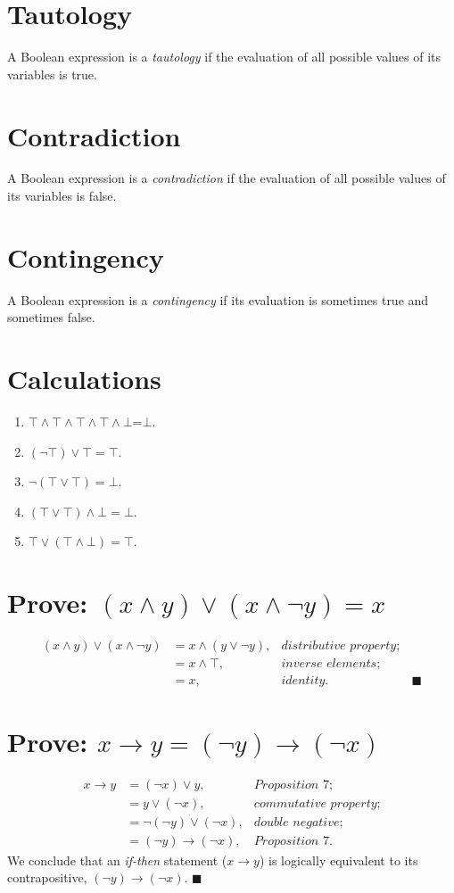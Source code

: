 \documentclass[12pt]{article}
\begin{document}
\section*{Tautology}
A Boolean expression is a \textit{tautology} if the evaluation of all possible values of its variables is true.
\section*{Contradiction}
A Boolean expression is a \textit{contradiction} if the evaluation of all possible values of its variables is false.
\section*{Contingency}
A Boolean expression is a \textit{contingency} if its evaluation is sometimes true and sometimes false.
\section{Calculations}
\begin{enumerate}
    \item$\top\land\top\land\top\land\top\land\bot$=$\bot$.
    \item$(\lnot\top)\lor\top=\top$.
    \item$\lnot(\top\lor\top)=\bot$.
    \item$(\top\lor\top)\land\bot=\bot$.
    \item$\top\lor(\top\land\bot)=\top$.
\end{enumerate}
\section{Prove: $(x\land y)\lor(x\land\lnot y)=x$}
\begin{align*}
(x\land y)\lor(x\land\lnot y)
&=x\land(y\lor\lnot y),&\textit{distributive property;}\\
&=x\land\top,&\textit{inverse elements;}\\
&=x,&\textit{identity.}&\,\blacksquare
\end{align*}
\section{Prove: $x\rightarrow y=(\lnot y)\rightarrow(\lnot x)$}
\begin{align*}
x\rightarrow y
&=(\lnot x)\lor y,&\textit{Proposition 7;}\\
&=y\lor(\lnot x),&\textit{commutative property;}\\
&=\lnot(\lnot y)\lor(\lnot x),&\textit{double negative;}\\
&=(\lnot y)\rightarrow(\lnot x),&\textit{Proposition 7.}
\end{align*}
We conclude that an \textit{if-then} statement ($x\rightarrow y$) is logically equivalent to its contrapositive, $(\lnot y)\rightarrow(\lnot x)$. $\blacksquare$
\end{document}
